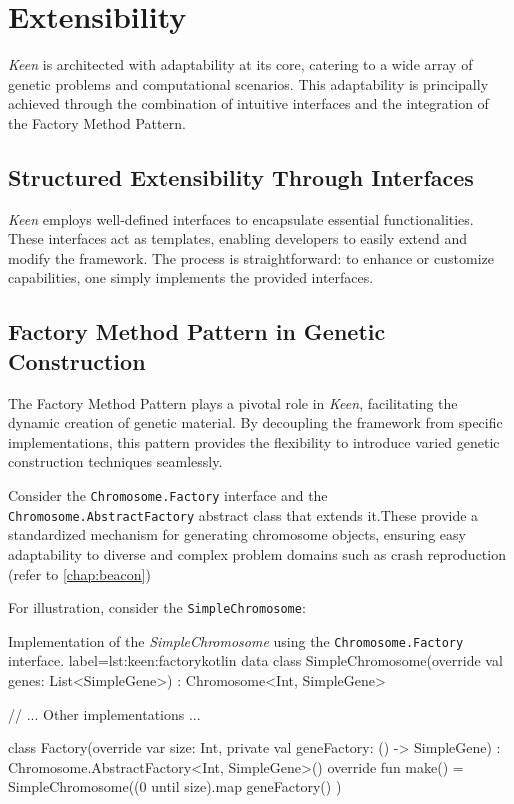\section{Extensibility}
\label{sec:keen:extensibility}

    \textit{Keen} is architected with adaptability at its core, catering to a 
    wide array of genetic problems and computational scenarios. This adaptability 
    is principally achieved through the combination of intuitive interfaces and 
    the integration of the Factory Method Pattern.

    \subsection{Structured Extensibility Through Interfaces}
        \textit{Keen} employs well-defined interfaces to encapsulate essential 
        functionalities. These interfaces act as templates, enabling developers to 
        easily extend and modify the framework. The process is straightforward: to 
        enhance or customize capabilities, one simply implements the provided 
        interfaces.

    \subsection{Factory Method Pattern in Genetic Construction}
        The Factory Method Pattern plays a pivotal role in \textit{Keen}, 
        facilitating the dynamic creation of genetic material. By decoupling the 
        framework from specific implementations, this pattern provides the 
        flexibility to introduce varied genetic construction techniques seamlessly.

        Consider the \texttt{Chromosome.Factory} interface and the 
        \texttt{Chromosome.AbstractFactory} abstract class that extends it.These 
        provide a standardized mechanism for generating chromosome objects, ensuring
        easy adaptability to diverse and complex problem domains such as crash
        reproduction (refer to \vref{chap:beacon})

        For illustration, consider the \texttt{SimpleChromosome}:

        \begin{code}{
        Implementation of the \textit{SimpleChromosome} using the 
        \texttt{Chromosome.Factory} interface.
        }{label=lst:keen:factory}{kotlin}
        data class SimpleChromosome(override val genes: List<SimpleGene>) :
            Chromosome<Int, SimpleGene> {
            // ... Other implementations ...

            class Factory(override var size: Int, private val geneFactory: () -> SimpleGene) :
                Chromosome.AbstractFactory<Int, SimpleGene>() {
                override fun make() = SimpleChromosome((0 until size).map { geneFactory() })
            }
        }
        \end{code}

